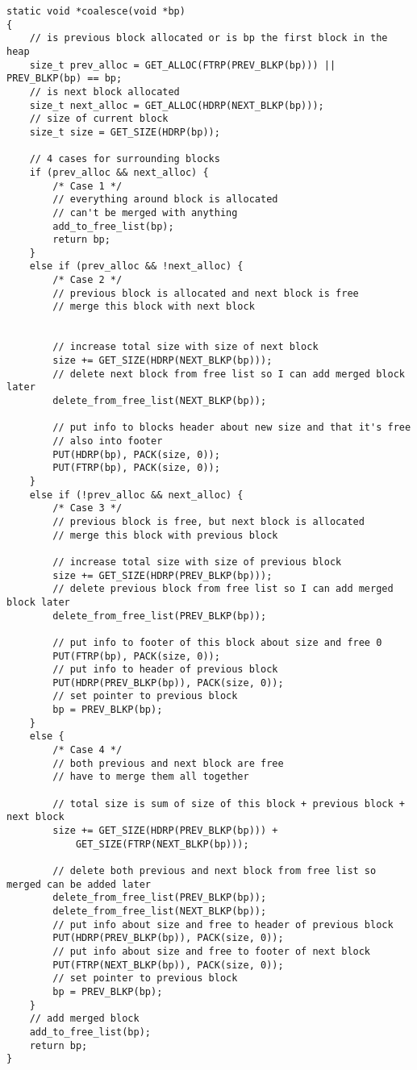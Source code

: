 \documentclass[a4paper]{article}
\begin{document}
\begin{lstlisting}[caption= {coalescing function, important are cases 1 and 3}]
static void *coalesce(void *bp)
{
	// is previous block allocated or is bp the first block in the heap
	size_t prev_alloc = GET_ALLOC(FTRP(PREV_BLKP(bp))) || PREV_BLKP(bp) == bp;
	// is next block allocated
	size_t next_alloc = GET_ALLOC(HDRP(NEXT_BLKP(bp)));
	// size of current block
	size_t size = GET_SIZE(HDRP(bp));

	// 4 cases for surrounding blocks
	if (prev_alloc && next_alloc) {
		/* Case 1 */
		// everything around block is allocated
		// can't be merged with anything
		add_to_free_list(bp);
		return bp;
	}
	else if (prev_alloc && !next_alloc) {
		/* Case 2 */
		// previous block is allocated and next block is free
		// merge this block with next block
		
		
		// increase total size with size of next block
		size += GET_SIZE(HDRP(NEXT_BLKP(bp)));
		// delete next block from free list so I can add merged block later
		delete_from_free_list(NEXT_BLKP(bp));

		// put info to blocks header about new size and that it's free
		// also into footer
		PUT(HDRP(bp), PACK(size, 0));
		PUT(FTRP(bp), PACK(size, 0));
	}
	else if (!prev_alloc && next_alloc) {
		/* Case 3 */
		// previous block is free, but next block is allocated
		// merge this block with previous block
		
		// increase total size with size of previous block
		size += GET_SIZE(HDRP(PREV_BLKP(bp)));
		// delete previous block from free list so I can add merged block later
		delete_from_free_list(PREV_BLKP(bp));

		// put info to footer of this block about size and free 0
		PUT(FTRP(bp), PACK(size, 0));
		// put info to header of previous block
		PUT(HDRP(PREV_BLKP(bp)), PACK(size, 0));
		// set pointer to previous block
		bp = PREV_BLKP(bp);
	}
	else {
		/* Case 4 */
		// both previous and next block are free
		// have to merge them all together
		
		// total size is sum of size of this block + previous block + next block
		size += GET_SIZE(HDRP(PREV_BLKP(bp))) +
			GET_SIZE(FTRP(NEXT_BLKP(bp)));

		// delete both previous and next block from free list so merged can be added later
		delete_from_free_list(PREV_BLKP(bp));
		delete_from_free_list(NEXT_BLKP(bp));
		// put info about size and free to header of previous block
		PUT(HDRP(PREV_BLKP(bp)), PACK(size, 0));
		// put info about size and free to footer of next block
		PUT(FTRP(NEXT_BLKP(bp)), PACK(size, 0));
		// set pointer to previous block
		bp = PREV_BLKP(bp);
	}
	// add merged block
	add_to_free_list(bp);
	return bp;
}
\end{lstlisting}
\end{document}
